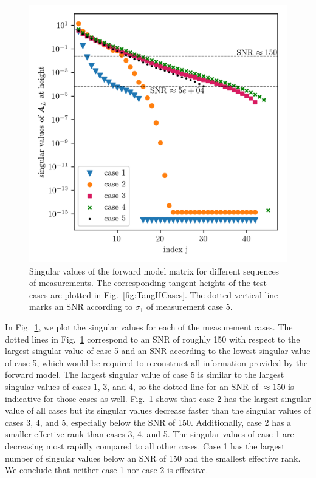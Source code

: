 \begin{figure}[ht!]
	\centering
	\includegraphics{SingValA.png}
	\caption[Singular values of linear forward model matrix for different sequences of measurements.]{Singular values of the forward model matrix for different sequences of measurements.
	The corresponding tangent heights of the test cases are plotted in Fig.~\ref{fig:TangHCases}. The dotted vertical line marks an SNR according to $\sigma_1$ of measurement case 5.}
\label{fig:SingA}
\end{figure}
In Fig.~\ref{fig:SingA}, we plot the singular values for each of the measurement cases.
The dotted lines in Fig.~\ref{fig:SingA} correspond to an SNR of roughly 150 with respect to the largest singular value of case 5 and an SNR according to the lowest singular value of case 5, which would be required to reconstruct all information provided by the forward model.
The largest singular value of case 5 is similar to the largest singular values of cases 1, 3, and 4, so the dotted line for an SNR of $\approx 150$ is indicative for those cases as well.
Fig.~\ref{fig:SingA} shows that case 2 has the largest singular value of all cases but its singular values decrease faster than the singular values of cases 3, 4, and 5, especially below the SNR of 150.
Additionally, case 2 has a smaller effective rank than cases 3, 4, and 5.
The singular values of case 1 are decreasing most rapidly compared to all other cases. Case 1 has the largest number of singular values below an SNR of 150 and the smallest effective rank.
We conclude that neither case 1 nor case 2 is effective.

